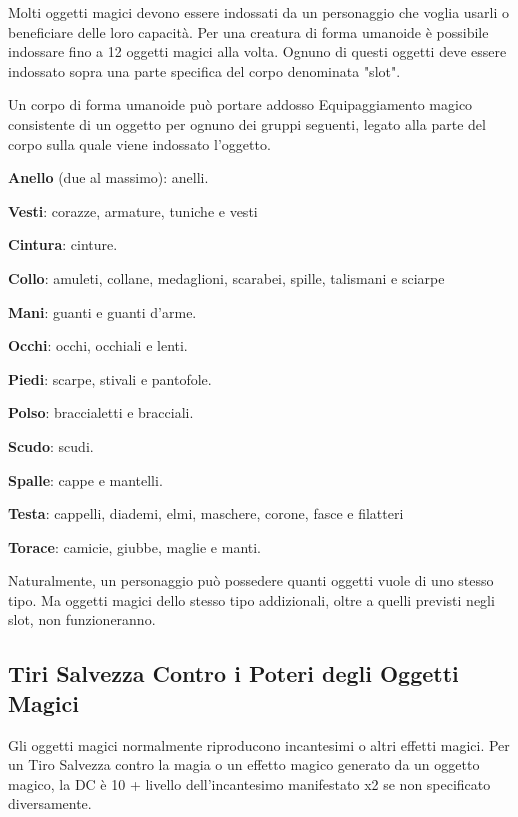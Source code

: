 \begin{multicols}{2}
	\label{oggetti-magici-sul-corpo}

	Molti oggetti magici devono essere indossati da un personaggio che voglia usarli o beneficiare delle loro capacità. Per una creatura di forma umanoide è possibile indossare fino a 12 oggetti magici alla volta. Ognuno di questi oggetti deve essere indossato sopra una parte specifica del corpo denominata "slot".

	Un corpo di forma umanoide può portare addosso Equipaggiamento magico consistente di un oggetto per ognuno dei gruppi seguenti, legato alla parte del corpo sulla quale viene indossato l'oggetto.

	\textbf{Anello} (due al massimo): anelli.

	\textbf{Vesti}: corazze, armature, tuniche e vesti

	\textbf{Cintura}: cinture.

	\textbf{Collo}: amuleti, collane, medaglioni, scarabei, spille, talismani e sciarpe

	\textbf{Mani}: guanti e guanti d'arme.

	\textbf{Occhi}: occhi, occhiali e lenti.

	\textbf{Piedi}: scarpe, stivali e pantofole.

	\textbf{Polso}: braccialetti e bracciali.

	\textbf{Scudo}: scudi.

	\textbf{Spalle}: cappe e mantelli.

	\textbf{Testa}: cappelli, diademi, elmi, maschere, corone, fasce e filatteri

	\textbf{Torace}: camicie, giubbe, maglie e manti.

	\medskip

	Naturalmente, un personaggio può possedere quanti oggetti vuole di uno stesso tipo. Ma oggetti magici dello stesso tipo addizionali, oltre a quelli previsti negli slot, non funzioneranno.

	\subsection{Tiri Salvezza Contro i Poteri degli Oggetti Magici}

	\label{tiri-salvezza-contro-i-poteri-degli-oggetti-magici}

	Gli oggetti magici normalmente riproducono incantesimi o altri effetti magici. Per un Tiro Salvezza contro la magia o un effetto magico generato da un oggetto magico, la DC è 10 + livello dell'incantesimo manifestato x2 se non specificato diversamente.


\end{multicols}
